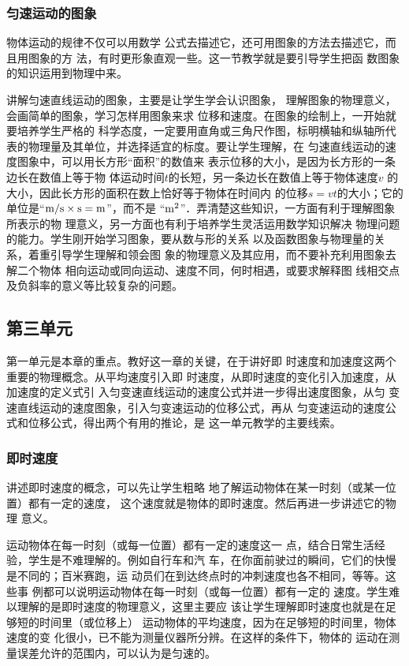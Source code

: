 \subsubsection{匀速运动的图象}

物体运动的规律不仅可以用数学
公式去描述它，还可用图象的方法去描述它，而且用图象的方
法，有时更形象直观一些。这一节教学就是要引导学生把函
数图象的知识运用到物理中来。

讲解匀速直线运动的图象，主要是让学生学会认识图象，
理解图象的物理意义，会画简单的图象，学习怎样用图象来求
位移和速度。在图象的绘制上，一开始就要培养学生严格的
科学态度，一定要用直角或三角尺作图，标明横轴和纵轴所代
表的物理量及其单位，并选择适宜的标度。要让学生理解，在
匀速直线运动的速度图象中，可以用长方形“面积”的数值来
表示位移的大小，是因为长方形的一条边长在数值上等于物
体运动时间$t$的长短，另一条边长在数值上等于物体速度$v$
的大小，因此长方形的面积在数上恰好等于物体在时间内
的位移$s=vt$的大小；它的单位是“${\rm m/s\times s=m}$”，而不是
“${\rm m^2}$”．弄清楚这些知识，一方面有利于理解图象所表示的物
理意义，另一方面也有利于培养学生灵活运用数学知识解决
物理问题的能力。学生刚开始学习图象，要从数与形的关系
以及函数图象与物理量的关系，着重引导学生理解和领会图
象的物理意义及其应用，而不要补充利用图象去解二个物体
相向运动或同向运动、速度不同，何时相遇，或要求解释图
线相交点及负斜率的意义等比较复杂的问题。

\subsection{第三单元}

第一单元是本章的重点。教好这一章的关键，在于讲好即
时速度和加速度这两个重要的物理概念。从平均速度引入即
时速度，从即时速度的变化引入加速度，从加速度的定义式引
入匀变速直线运动的速度公式并进一步得出速度图象，从匀
变速直线运动的速度图象，引入匀变速运动的位移公式，再从
匀变速运动的速度公式和位移公式，得出两个有用的推论，是
这一单元教学的主要线索。

\subsubsection{即时速度}

讲述即时速度的概念，可以先让学生粗略
地了解运动物体在某一时刻（或某一位置）都有一定的速度，
这个速度就是物体的即时速度。然后再进一步讲述它的物理
意义。

运动物体在每一时刻（或每一位置）都有一定的速度这一
点，结合日常生活经验，学生是不难理解的。例如自行车和汽
车，在你面前驶过的瞬间，它们的快慢是不同的；百米赛跑，运
动员们在到达终点时的冲刺速度也各不相同，等等。这些事
例都可以说明运动物体在每一时刻（或每一位置）都有一定的
速度。学生难以理解的是即时速度的物理意义，这里主要应
该让学生理解即时速度也就是在足够短的时间里（或位移上）
运动物体的平均速度，因为在足够短的时间里，物体速度的变
化很小，已不能为测量仪器所分辨。在这样的条件下，物体的
运动在测量误差允许的范围内，可以认为是匀速的。

